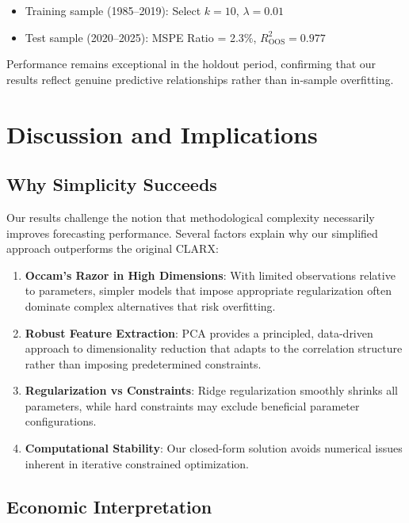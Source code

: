 \documentclass[11pt,letterpaper]{article}
\theoremstyle{plain}
\theoremstyle{definition}
\theoremstyle{remark}
\begin{document}
\begin{itemize}
\item Training sample (1985--2019): Select $k=10$, $\lambda=0.01$
\item Test sample (2020--2025): MSPE Ratio = 2.3\%, $R^2_{\text{OOS}} = 0.977$
\end{itemize}

Performance remains exceptional in the holdout period, confirming that our results reflect genuine predictive relationships rather than in-sample overfitting.

\section{Discussion and Implications}

\subsection{Why Simplicity Succeeds}

Our results challenge the notion that methodological complexity necessarily improves forecasting performance. Several factors explain why our simplified approach outperforms the original CLARX:

\begin{enumerate}
\item \textbf{Occam's Razor in High Dimensions}: With limited observations relative to parameters, simpler models that impose appropriate regularization often dominate complex alternatives that risk overfitting.

\item \textbf{Robust Feature Extraction}: PCA provides a principled, data-driven approach to dimensionality reduction that adapts to the correlation structure rather than imposing predetermined constraints.

\item \textbf{Regularization vs Constraints}: Ridge regularization smoothly shrinks all parameters, while hard constraints may exclude beneficial parameter configurations.

\item \textbf{Computational Stability}: Our closed-form solution avoids numerical issues inherent in iterative constrained optimization.
\end{enumerate}

\subsection{Economic Interpretation}
\end{document}
